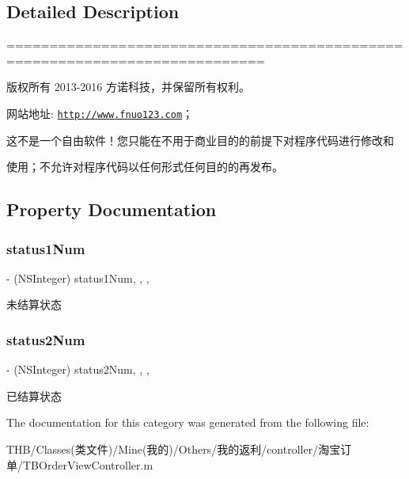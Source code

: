 \subsection{Detailed Description}
============================================================================

版权所有 2013-\/2016 方诺科技，并保留所有权利。

网站地址\+: \href{http://www.fnuo123.com}{\tt http\+://www.\+fnuo123.\+com}； 



这不是一个自由软件！您只能在不用于商业目的的前提下对程序代码进行修改和

使用；不允许对程序代码以任何形式任何目的的再发布。 

 

\subsection{Property Documentation}
\mbox{\label{category_t_b_order_view_controller_07_08_ae14bca742518267c0f84b8915ce88776}} 
\subsubsection{\texorpdfstring{status1\+Num}{status1Num}}
{\footnotesize\ttfamily -\/ (N\+S\+Integer) status1\+Num\hspace{0.3cm}{\ttfamily [read]}, {\ttfamily [write]}, {\ttfamily [nonatomic]}, {\ttfamily [assign]}}

未结算状态 \mbox{\label{category_t_b_order_view_controller_07_08_ae24c013c2bfc18fd367eb1530c2bc391}} 
\subsubsection{\texorpdfstring{status2\+Num}{status2Num}}
{\footnotesize\ttfamily -\/ (N\+S\+Integer) status2\+Num\hspace{0.3cm}{\ttfamily [read]}, {\ttfamily [write]}, {\ttfamily [nonatomic]}, {\ttfamily [assign]}}

已结算状态 

The documentation for this category was generated from the following file\+:\begin{DoxyCompactItemize}
\item 
T\+H\+B/\+Classes(类文件)/\+Mine(我的)/\+Others/我的返利/controller/淘宝订单/T\+B\+Order\+View\+Controller.\+m\end{DoxyCompactItemize}
